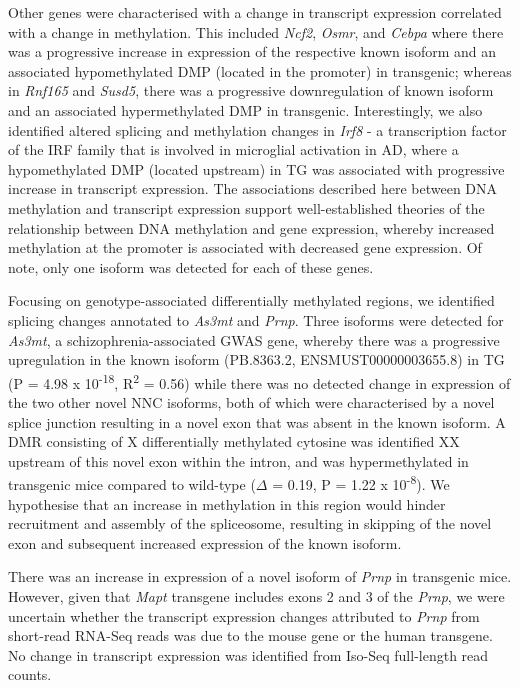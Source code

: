 
Other genes were characterised with a change in transcript expression correlated with a change in methylation. This included \textit{Ncf2}, \textit{Osmr}, and \textit{Cebpa} where there was a progressive increase in expression of the respective known isoform and an associated hypomethylated DMP (located in the promoter) in transgenic; whereas in \textit{Rnf165} and \textit{Susd5}, there was a progressive downregulation of known isoform and an associated hypermethylated DMP in transgenic. Interestingly, we also identified altered splicing and methylation changes in \textit{Irf8} - a transcription factor of the IRF family that is involved in microglial activation in AD\cite{Zeng2017}, where a hypomethylated DMP (located upstream) in TG was associated with progressive increase in transcript expression. The associations described here between DNA methylation and transcript expression support well-established theories of the relationship between DNA methylation and gene expression, whereby increased methylation at the promoter is associated with decreased gene expression. Of note, only one isoform was detected for each of these genes.  

Focusing on genotype-associated differentially methylated regions, we identified splicing changes annotated to \textit{As3mt} and \textit{Prnp}. Three isoforms were detected for \textit{As3mt}, a schizophrenia-associated GWAS gene, whereby there was a progressive upregulation in the known isoform (PB.8363.2, ENSMUST00000003655.8) in TG (P = 4.98 x 10\textsuperscript{-18}, R\textsuperscript{2} = 0.56) while there was no detected change in expression of the two other novel NNC isoforms, both of which were characterised by a novel splice junction resulting in a novel exon that was absent in the known isoform. A DMR consisting of X differentially methylated cytosine was identified XX upstream of this novel exon within the intron, and was hypermethylated in transgenic mice compared to wild-type ($\Delta$ = 0.19, P = 1.22 x 10\textsuperscript{-8}). We hypothesise that an increase in methylation in this region would hinder recruitment and assembly of the spliceosome, resulting in skipping of the novel exon and subsequent increased expression of the known isoform. 

There was an increase in expression of a novel isoform of \textit{Prnp} in transgenic mice. However, given that \textit{Mapt} transgene includes exons 2 and 3 of the \textit{Prnp}, we were uncertain whether the transcript expression changes attributed to \textit{Prnp} from short-read RNA-Seq reads was due to the mouse gene or the human transgene. No change in transcript expression was identified from Iso-Seq full-length read counts. 
